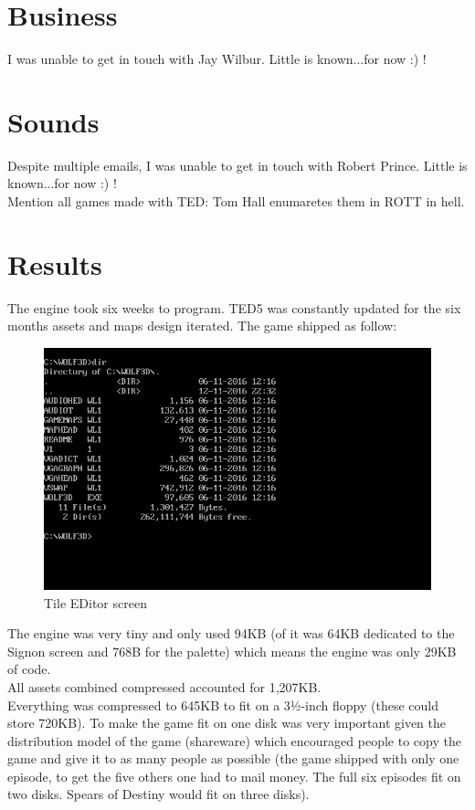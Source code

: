 \documentclass[book.tex]{subfiles}
\begin{document}
\section{Business}
I was unable to get in touch with Jay Wilbur. Little is known...for now :) !\\
\section{Sounds}
Despite multiple emails, I was unable to get in touch with Robert Prince. Little is known...for now :) !\\
Mention all games made with TED: Tom Hall enumaretes them in ROTT in hell.


\section{Results}
The engine took six weeks to program. TED5 was constantly updated for the six months assets and maps design iterated. The game shipped as follow:
 \begin{figure}[H]
\centering
 \includegraphics[width=\textwidth]{imgs/result.png}
 \caption{Tile EDitor screen} \label{fig:mips}
 \end{figure}
 The engine was very tiny and only used 94KB (of it was 64KB dedicated to the Signon screen and 768B for the palette) which means the engine was only 29KB of code.\\
 All assets combined compressed accounted for 1,207KB.\\
 Everything was compressed to 645KB to fit on a 3½-inch floppy (these could store 720KB). To make the game fit on one disk was very important given the distribution model
 of the game (shareware) which encouraged people to copy the game and give it to as many people as possible (the game shipped with only one episode, to get the five others
 one had to mail money. The full six episodes fit on two disks. Spears of Destiny would fit on three disks).
\end{document}

